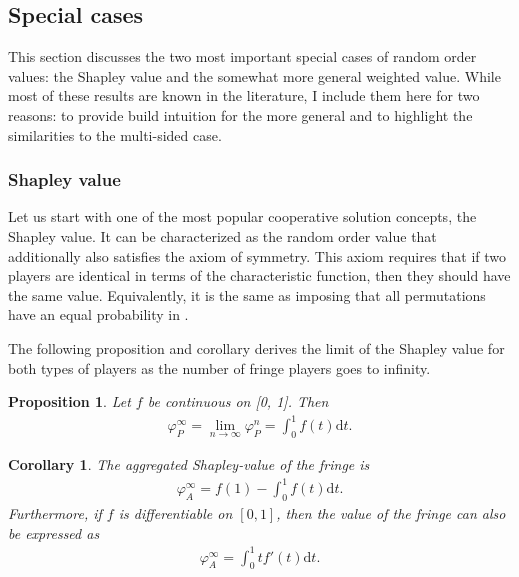 \documentclass[a4paper]{article}
\newtheorem{proposition}{Proposition}
\newtheorem{corollary}{Corollary}
\newcommand{\dt}{\mathrm{d}t}
\begin{document}
\subsection{Special cases}

This section discusses the two most important special cases of random order values: the Shapley value and the somewhat more general weighted value.
While most of these results are known in the literature, I include them here for two reasons: to provide build intuition for the more general and to highlight the similarities to the multi-sided case.

\subsubsection{Shapley value}

Let us start with one of the most popular cooperative solution concepts, the Shapley value.
It can be characterized as the random order value that additionally also satisfies the axiom of symmetry.
This axiom requires that if two players are identical in terms of the characteristic function, then they should have the same value.
Equivalently, it is the same as imposing that all permutations have an equal probability in .

The following proposition and corollary derives the limit of the Shapley value for both types of players as the number of fringe players goes to infinity.

\begin{proposition}
    \label{prop:one_sided}
    Let $f$ be continuous on [0, 1]. Then
    \begin{align*}
        \varphi_P^\infty = \lim_{n \to \infty} \varphi_P^n = \int_0^1 f(t) \dt .
    \end{align*}
\end{proposition}

\begin{corollary}
    \label{cor:fringe_value}
    The aggregated Shapley-value of the fringe is
    \begin{align*}
        \varphi_A^\infty = f(1) - \int_0^1 f(t) \dt.
    \end{align*}
    Furthermore, if $f$ is differentiable on $[0, 1]$, then the value of the fringe can also be expressed as
    \begin{align*}
        \varphi_A^\infty = \int_0^1 t f'(t) \dt.
    \end{align*}
\end{corollary}
\end{document}
